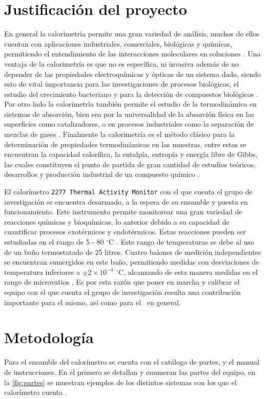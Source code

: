 \section{Justificación del proyecto}
	En general la calorimetría permite una gran variedad de análisis, muchos de ellos cuentan con aplicaciones industriales, comerciales, biológicas y químicas, permitiendo el entendimiento de las interacciones moleculares en soluciones \cite{blandamer1998titration}. Una ventaja de la calorimetría es que no es específica, ni invasiva además de no depender de las propiedades electroquímicas y ópticas de un sistema dado, siendo esto de vital importancia para las investigaciones de procesos biológicos, el estudio del crecimiento bacteriano y para la detección de compuestos biológicos \cite{winkelmann2004application}. Por otro lado la calorimetría también permite el estudio de la termodinámica en sistemas de absorción, bien sea por la universalidad de la absorción física en las superficies como catalizadores, o en procesos industriales como la separación de mezclas de gases \cite{morrison1987calorimetry}. Finalmente la calorimetría es el método clásico para la determinación de propiedades termodinámicas en las muestras, entre estas se encuentran la capacidad calorífica, la entalpía, entropía y energía libre de Gibbs, las cuales constituyen el punto de partida de gran cantidad de estudios teóricos, desarrollos y producción industrial de un compuesto químico \cite{wang2005determination, gaisford2016principles}.

	El calorímetro \texttt{2277 Thermal Activity Monitor} con el que cuenta el grupo de investigación se encuentra desarmado, a la espera de su ensamble y puesta en funcionamiento. Este instrumento permite monitorear una gran variedad de reacciones químicas y bioquímicas, lo anterior debido a su capacidad de cuantificar procesos exotérmicos y endotérmicos. Estas reacciones pueden ser estudiadas en el rango de 5 - 80 $^\circ$C \cite{Suurkuusk}. Este rango de temperaturas se debe al uso de un baño termostatado de 25 litros. Cuatro balones de medición independientes se encuentran sumergidos en este baño, permitiendo medidas con desviaciones de temperatura inferiores a $\pm2\times10^{-4}$ $^\circ$C, alcanzando de esta manera medidas en el rango de microvatios \cite{Suurkuusk}. Es por esta razón que poner en marcha y calibrar el equipo con el que cuenta el grupo de investigación resulta una contribución importante para el mismo, así como para el \deptname\ en general.
	
\section{Metodología}
	Para el ensamble del calorímetro se cuenta con el catálogo de partes, y el manual de instrucciones. En el primero se detallan y enumeran las partes del equipo, en la \autoref{fig:partes} se muestran ejemplos de los distintos sistemas con los que el calorímetro cuenta \cite{Suurkuusk}. 
	

